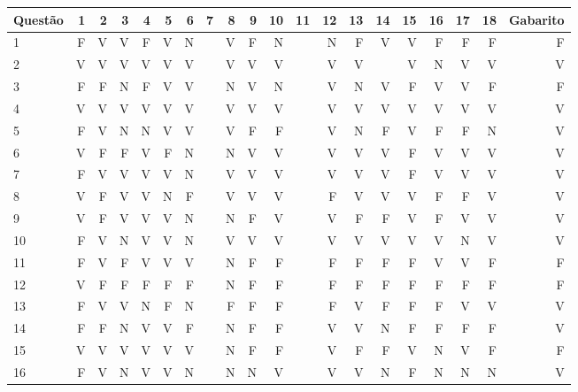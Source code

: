 \begin{apendicesenv}
\begin{center}
\begin{tabular}{ l r r r r r r r r r r r r r r r r r r r}
	\multirow[c]{-2}{*}{Questão} & \textcolor[rgb]{0.9,0,0}{1} & \textcolor[rgb]{0,0,0.9}{2} & \textcolor[rgb]{0.9,0,0}{3} & \textcolor[rgb]{0.9,0,0}{4} & \textcolor[rgb]{0.9,0,0}{5} & \textcolor[rgb]{0.9,0,0}{6} & \textcolor[rgb]{0.9,0,0}{7} & \textcolor[rgb]{0.9,0,0}{8} & \textcolor[rgb]{0.9,0,0}{9} & \textcolor[rgb]{0.9,0,0}{10} & \textcolor[rgb]{0,0,0.9}{11} & \textcolor[rgb]{0.9,0,0}{12} & \textcolor[rgb]{0,0,0.9}{13} & \textcolor[rgb]{0,0,0.9}{14} & \textcolor[rgb]{0.9,0,0}{15} & \textcolor[rgb]{0.9,0,0}{16} & \textcolor[rgb]{0.9,0,0}{17} & \textcolor[rgb]{0,0,0.9}{18} & Gabarito\\
	\hline
	1	&	F	&	V	&	V	&	F	&	V	&	N	&       &	V	&	F	&	N	&       &	N	&	F	&	V	&	V	&	F	&	F	&	F	&	F	\\
	2	&	V	&	V	&	V	&	V	&	V	&	V	&       &	V	&	V	&	V	&       &	V	&	V	&		&	V	&	N	&	V	&	V	&	V	\\
	3	&	F	&	F	&	N	&	F	&	V	&	V	&       &	N	&	V	&	N	&       &	V	&	N	&	V	&	F	&	V	&	V	&	F	&	F	\\
	4	&	V	&	V	&	V	&	V	&	V	&	V	&       &	V	&	V	&	V	&       &	V	&	V	&	V	&	V	&	V	&	V	&	V	&	V	\\
	5	&	F	&	V	&	N	&	N	&	V	&	V	&       &	V	&	F	&	F	&       &	V	&	N	&	F	&	V	&	F	&	F	&	N	&	V	\\
	6	&	V	&	F	&	F	&	V	&	F	&	N	&       &	N	&	V	&	V	&       &	V	&	V	&	V	&	F	&	V	&	V	&	V	&	V	\\
	7	&	F	&	V	&	V	&	V	&	V	&	N	&       &	V	&	V	&	V	&       &	V	&	V	&	V	&	F	&	V	&	V	&	V	&	V	\\
	8	&	V	&	F	&	V	&	V	&	N	&	F	&       &	V	&	V	&	V	&       &	F	&	V	&	V	&	V	&	F	&	F	&	V	&	V	\\
	9	&	V	&	F	&	V	&	V	&	V	&	N	&       &	N	&	F	&	V	&       &	V	&	F	&	F	&	V	&	F	&	V	&	V	&	V	\\
	10	&	F	&	V	&	N	&	V	&	V	&	N	&       &	V	&	V	&	V	&       &	V	&	V	&	V	&	V	&	V	&	N	&	V	&	V	\\
	11	&	F	&	V	&	F	&	V	&	V	&	V	&       &	N	&	F	&	F	&       &	F	&	F	&	F	&	F	&	V	&	V	&	F	&	F	\\
	12	&	V	&	F	&	F	&	F	&	F	&	F	&       &	N	&	F	&	F	&       &	F	&	F	&	F	&	F	&	F	&	F	&	F	&	F	\\
	13	&	F	&	V	&	V	&	N	&	F	&	N	&       &	F	&	F	&	F	&       &	F	&	V	&	F	&	F	&	F	&	V	&	V	&	V	\\
	14	&	F	&	F	&	N	&	V	&	V	&	F	&       &	N	&	F	&	F	&       &	V	&	V	&	N	&	F	&	F	&	F	&	F	&	V	\\
	15	&	V	&	V	&	V	&	V	&	V	&	V	&       &	N	&	F	&	F	&       &	V	&	F	&	F	&	V	&	N	&	V	&	F	&	F	\\
	16	&	F	&	V	&	N	&	V	&	V	&	N	&       &	N	&	N	&	V	&       &	V	&	V	&	N	&	F	&	N	&	N	&	N	&	V	\\

\end{tabular}
\end{center}
\end{apendicesenv}
